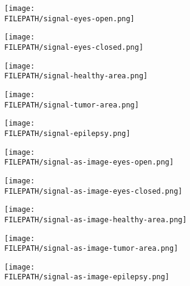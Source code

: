 \documentclass[conference]{IEEEtran}
\providecommand{\FILEPATH}{~/github.com/pbizopoulos/signal2image-modules-in-deep-neural-networks-for-eeg-classification/packages/python/tmp}
\begin{document}
\begin{figure*}[!t]
  \centering
  \begin{subfigure}{0.19\linewidth}
    \centering
    \texttt{[image: \\FILEPATH/signal-eyes-open.png]}
  \end{subfigure}
  \begin{subfigure}{0.19\linewidth}
    \centering
    \texttt{[image: \\FILEPATH/signal-eyes-closed.png]}
  \end{subfigure}
  \begin{subfigure}{0.19\linewidth}
    \centering
    \texttt{[image: \\FILEPATH/signal-healthy-area.png]}
  \end{subfigure}
  \begin{subfigure}{0.19\linewidth}
    \centering
    \texttt{[image: \\FILEPATH/signal-tumor-area.png]}
  \end{subfigure}
  \begin{subfigure}{0.19\linewidth}
    \centering
    \texttt{[image: \\FILEPATH/signal-epilepsy.png]}
  \end{subfigure}

  \begin{subfigure}{0.19\linewidth}
    \centering
    \texttt{[image: \\FILEPATH/signal-as-image-eyes-open.png]}
  \end{subfigure}
  \begin{subfigure}{0.19\linewidth}
    \centering
    \texttt{[image: \\FILEPATH/signal-as-image-eyes-closed.png]}
  \end{subfigure}
  \begin{subfigure}{0.19\linewidth}
    \centering
    \texttt{[image: \\FILEPATH/signal-as-image-healthy-area.png]}
  \end{subfigure}
  \begin{subfigure}{0.19\linewidth}
    \centering
    \texttt{[image: \\FILEPATH/signal-as-image-tumor-area.png]}
  \end{subfigure}
  \begin{subfigure}{0.19\linewidth}
    \centering
    \texttt{[image: \\FILEPATH/signal-as-image-epilepsy.png]}
  \end{subfigure}


\end{figure*}
\end{document}
